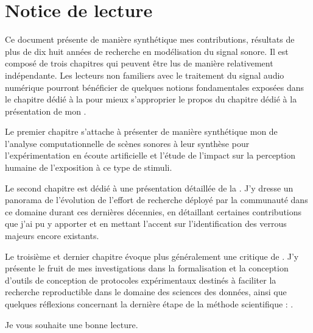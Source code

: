 \chapter{\nmu Notice \nmu de lecture} \label{chap:notice}

Ce document présente de manière synthétique mes contributions, résultats de plus de dix huit années de recherche en modélisation du signal sonore. Il est composé de trois chapitres qui peuvent être lus de manière relativement indépendante. Les lecteurs non familiers avec le traitement du signal audio numérique pourront bénéficier de quelques notions fondamentales exposées dans le chapitre dédié à la  pour mieux s'approprier le propos du chapitre dédié à la présentation de mon .

Le premier chapitre s'attache à présenter de manière synthétique mon  de l'analyse computationnelle de scènes sonores à leur synthèse pour l'expérimentation en écoute artificielle et l'étude de l'impact sur la perception humaine de l'exposition à ce type de stimuli.

Le second chapitre est dédié à une présentation détaillée de la . J'y dresse un panorama de l'évolution de l'effort de recherche déployé par la communauté dans ce domaine durant ces dernières décennies, en détaillant certaines contributions que j'ai pu y apporter et en mettant l'accent sur l'identification des verrous majeurs encore existants.

Le troisième et dernier chapitre évoque plus généralement une critique de . J'y présente le fruit de mes investigations dans la formalisation et la conception d'outils de conception de protocoles expérimentaux destinés à faciliter la recherche reproductible dans le domaine des sciences des données, ainsi que quelques réflexions concernant la dernière étape de la méthode scientifique : .


Je vous souhaite une bonne lecture.

